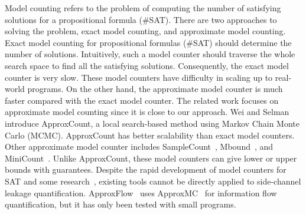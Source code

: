 Model counting refers to the problem of computing the number of satisfying
solutions for a propositional formula (\#SAT). There are two approaches to
solving the problem, exact model counting, and approximate model
counting. Exact model counting for propositional formulas (\#SAT) should determine
the number of solutions. Intuitively, such a model counter should traverse the whole
search space to find all the satisfying solutions. Consequently, the exact model counter is very slow. These model counters have difficulty in scaling up to real-world programs.
On the other hand, the approximate model counter is much faster compared with the exact model counter. The related work focuses on approximate model counting since it is close to our approach. Wei and Selman~\cite{wei2005new} introduce
ApproxCount, a local search-based method using Markov Chain Monte
Carlo (MCMC). ApproxCount has better scalability than
exact model counters. Other approximate model counter includes
SampleCount~\cite{gomes2007sampling},
Mbound~\cite{gomes2006model}, and MiniCount~\cite{kroc2008leveraging}.
Unlike ApproxCount, these model counters can give lower or upper bounds with guarantees.
Despite the rapid development of model counters for SAT and some
research~\cite{chistikov2017approximate,phan2015model}, existing tools cannot be directly applied to side-channel leakage quantification.
ApproxFlow~\cite{biondi2018scalable} uses ApproxMC~\cite{chakraborty2016algorithmic} for information flow quantification, but it has only been tested with small programs.

